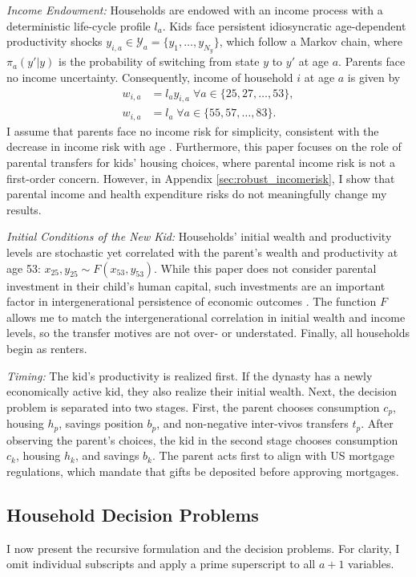 \documentclass[12pt]{article}
\begin{document}
\textit{Income Endowment:} Households are endowed with an income process with a deterministic life-cycle profile $l_a$. Kids face persistent idiosyncratic age-dependent productivity shocks $y_{i,a}\in\mathcal{Y}_a=\{y_1,\dots,y_{N_y}\}$, which follow a Markov chain, where $\pi_a(y'|y)$ is the probability of switching from state $y$ to $y'$ at age $a$. Parents face no income uncertainty. Consequently, income of household $i$ at age $a$ is given by
\begin{align}
w_{i,a} &= l_ay_{i,a} \; \forall a\in\{25,27,\dots,53\}, \label{eq:wk} \\
w_{i,a} &= l_a \; \forall a\in\{55,57,\dots,83\}. \label{eq:wp}
\end{align}
I assume that parents face no income risk for simplicity, consistent with the decrease in income risk with age \citep{Sanchez2020}. Furthermore, this paper focuses on the role of parental transfers for kids' housing choices, where parental income risk is not a first-order concern. However, in Appendix \ref{sec:robust_incomerisk}, I show that parental income and health expenditure risks do not meaningfully change my results.

\textit{Initial Conditions of the New Kid:} Households' initial wealth and productivity levels are stochastic yet correlated with the parent's wealth and productivity at age 53: $x_{25},y_{25} \sim F(x_{53},y_{53})$. While this paper does not consider parental investment in their child's human capital, such investments are an important factor in intergenerational persistence of economic outcomes \citep{Daruich2018,Lee2019}. The function $F$ allows me to match the intergenerational correlation in initial wealth and income levels, so the transfer motives are not over- or understated. Finally, all households begin as renters.

\textit{Timing:} The kid's productivity is realized first. If the dynasty has a newly economically active kid, they also realize their initial wealth. Next, the decision problem is separated into two stages. First, the parent chooses consumption $c_p$, housing $h_p$, savings position $b_p$, and non-negative inter-vivos transfers $t_p$. After observing the parent's choices, the kid in the second stage chooses consumption $c_k$, housing $h_k$, and savings $b_k$. The parent acts first to align with US mortgage regulations, which mandate that gifts be deposited before approving mortgages.

\subsection{Household Decision Problems}
I now present the recursive formulation and the decision problems. For clarity, I omit individual subscripts and apply a prime superscript to all $a+1$ variables.
\end{document}
